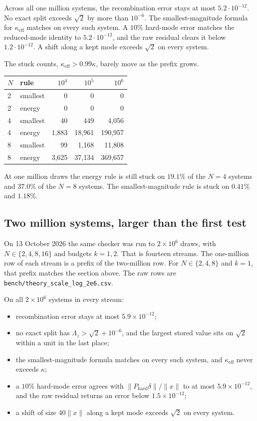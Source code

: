 \documentclass[11pt,a4paper]{article}
\begin{document}
Across all one million systems, the recombination error stays at most \(5.2\cdot 10^{-12}\).
No exact split exceeds \(\sqrt{2}\) by more than \(10^{-6}\).
The smallest-magnitude formula for \(\kappa_{\mathrm{eff}}\) matches on every such system.
A \(10\%\) hard-mode error matches the reduced-mode identity to \(5.2\cdot 10^{-12}\), and the raw residual clears it below \(1.2\cdot 10^{-12}\).
A shift along a kept mode exceeds \(\sqrt{2}\) on every system.

The stuck counts, \(\kappa_{\mathrm{eff}}>0.99\kappa\), barely move as the prefix grows.

\begin{center}
\begin{tabular}{@{}llrrr@{}}
\toprule
\(N\) & rule & \(10^{4}\) & \(10^{5}\) & \(10^{6}\) \\
\midrule
2 & smallest & 0 & 0 & 0 \\
2 & energy & 0 & 0 & 0 \\
4 & smallest & 40 & 449 & 4{,}056 \\
4 & energy & 1{,}883 & 18{,}961 & 190{,}957 \\
8 & smallest & 99 & 1{,}168 & 11{,}808 \\
8 & energy & 3{,}625 & 37{,}134 & 369{,}657 \\
\bottomrule
\end{tabular}
\end{center}

At one million draws the energy rule is still stuck on \(19.1\%\) of the \(N=4\) systems and \(37.0\%\) of the \(N=8\) systems.
The smallest-magnitude rule is stuck on \(0.41\%\) and \(1.18\%\).

\subsection{Two million systems, larger than the first test}
On 13 October 2026 the same checker was run to \(2\times 10^{6}\) draws, with \(N\in\{2,4,8,16\}\) and budgets \(k=1,2\).
That is fourteen streams.
The one-million row of each stream is a prefix of the two-million row.
For \(N\in\{2,4,8\}\) and \(k=1\), that prefix matches the section above.
The raw rows are \texttt{bench/theory\_scale\_log\_2e6.csv}.

On all \(2\times 10^{6}\) systems in every stream:
\begin{itemize}
  \item recombination error stays at most \(5.9\times 10^{-12}\);
  \item no exact split has \(\Lambda_z>\sqrt{2}+10^{-6}\), and the largest stored value sits on \(\sqrt{2}\) within a unit in the last place;
  \item the smallest-magnitude formula matches on every such system, and \(\kappa_{\mathrm{eff}}\) never exceeds \(\kappa\);
  \item a \(10\%\) hard-mode error agrees with \(\lVert P_{\mathrm{hard}}\delta\rVert/\lVert x\rVert\) to at most \(5.9\times 10^{-12}\), and the raw residual returns an error below \(1.5\times 10^{-12}\);
  \item a shift of size \(40\lVert x\rVert\) along a kept mode exceeds \(\sqrt{2}\) on every system.
\end{itemize}
\end{document}
